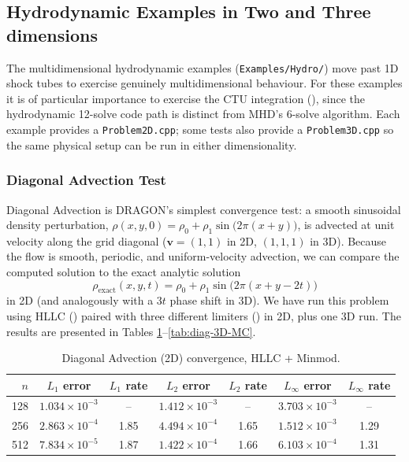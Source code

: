 \documentclass[11pt]{report}
\newcommand{\bash}[1]{\lstinline[language=bash]{#1}}
\begin{document}
\subsection{Hydrodynamic Examples in Two and Three dimensions}

The multidimensional hydrodynamic examples (\bash{Examples/Hydro/}) move past 1D shock tubes to exercise genuinely multidimensional behaviour.%
For these examples it is of particular importance to exercise the CTU integration (), since the hydrodynamic 12-solve code path is distinct from MHD's 6-solve algorithm. Each example provides a \bash{Problem2D.cpp}; some tests also provide a \bash{Problem3D.cpp} so the same physical setup can be run in either dimensionality.

\subsubsection{Diagonal Advection Test}
\label{sec:diagonal-advection}

Diagonal Advection is DRAGON's simplest convergence test: a smooth sinusoidal density perturbation, $\rho(x,y,0) = \rho_0 + \rho_1\sin\!\big(2\pi(x+y)\big)$, is advected at unit velocity along the grid diagonal ($\mathbf{v} = (1,1)$ in 2D, $(1,1,1)$ in 3D). 
Because the flow is smooth, periodic, and uniform-velocity advection, we can compare the computed solution to the  exact analytic solution 
\begin{equation}\rho_\mathrm{exact}(x,y,t) = \rho_0 + \rho_1\sin\!\big(2\pi(x+y-2t)\big)\end{equation}
 in 2D (and analogously with a $3t$ phase shift in 3D).
We have run this problem using HLLC () paired with three different limiters () in 2D, plus one 3D run. The results are presented in Tables \ref{tab:diag-2D-minmod}--\ref{tab:diag-3D-MC}.

\begin{table}[htbp]
\centering
\caption{Diagonal Advection  (2D) convergence, HLLC + Minmod.}
\label{tab:diag-2D-minmod}
\begin{tabular}{rcccccc}
\toprule
$n$ & $L_1$ error & $L_1$ rate & $L_2$ error & $L_2$ rate & $L_\infty$ error & $L_\infty$ rate \\
\midrule
128 & $1.034\times10^{-3}$ & --   & $1.412\times10^{-3}$ & --   & $3.703\times10^{-3}$ & --   \\
256 & $2.863\times10^{-4}$ & 1.85 & $4.494\times10^{-4}$ & 1.65 & $1.512\times10^{-3}$ & 1.29 \\
512 & $7.834\times10^{-5}$ & 1.87 & $1.422\times10^{-4}$ & 1.66 & $6.103\times10^{-4}$ & 1.31 \\
\bottomrule
\end{tabular}
\end{table}
\end{document}

